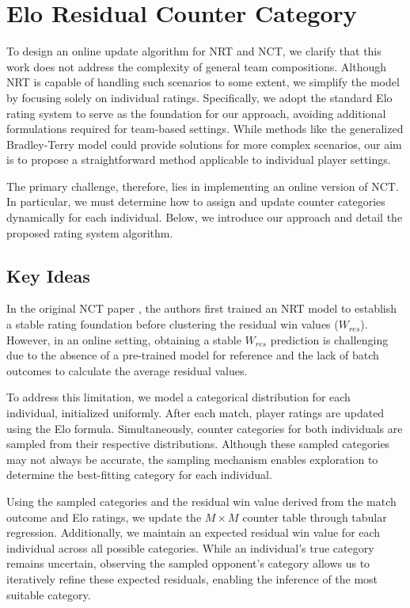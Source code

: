 \section{Elo Residual Counter Category}

To design an online update algorithm for NRT and NCT, we clarify that this work does not address the complexity of general team compositions. Although NRT is capable of handling such scenarios to some extent, we simplify the model by focusing solely on individual ratings. Specifically, we adopt the standard Elo rating system to serve as the foundation for our approach, avoiding additional formulations required for team-based settings. While methods like the generalized Bradley-Terry model \citep{generalized_bt} could provide solutions for more complex scenarios, our aim is to propose a straightforward method applicable to individual player settings.

The primary challenge, therefore, lies in implementing an online version of NCT. In particular, we must determine how to assign and update counter categories dynamically for each individual. Below, we introduce our approach and detail the proposed rating system algorithm.

\subsection{Key Ideas}

In the original NCT paper \citep{game_balance_analysis}, the authors first trained an NRT model to establish a stable rating foundation before clustering the residual win values ($W_{res}$). However, in an online setting, obtaining a stable $W_{res}$ prediction is challenging due to the absence of a pre-trained model for reference and the lack of batch outcomes to calculate the average residual values.

To address this limitation, we model a categorical distribution for each individual, initialized uniformly. After each match, player ratings are updated using the Elo formula. Simultaneously, counter categories for both individuals are sampled from their respective distributions. Although these sampled categories may not always be accurate, the sampling mechanism enables exploration to determine the best-fitting category for each individual.

Using the sampled categories and the residual win value derived from the match outcome and Elo ratings, we update the $M \times M$ counter table through tabular regression. Additionally, we maintain an expected residual win value for each individual across all possible categories. While an individual’s true category remains uncertain, observing the sampled opponent’s category allows us to iteratively refine these expected residuals, enabling the inference of the most suitable category.

